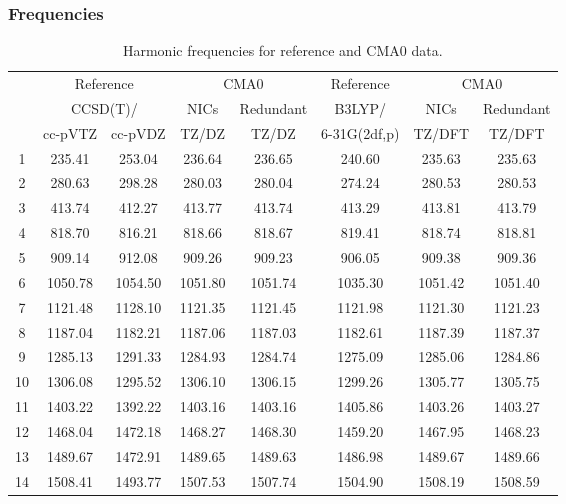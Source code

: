 \documentclass[10pt,oneside]{article}
\begin{document}
\begin{table}[h!]
\subsubsection*{Frequencies}
\centering
\caption{Harmonic frequencies for reference and CMA0 data.}
\begin{tabular}{cccccccc}
\toprule
{} & \multicolumn{2}{c}{Reference} & \multicolumn{2}{c}{CMA0} &    Reference & \multicolumn{2}{c}{CMA0} \\
{} & \multicolumn{2}{c}{CCSD(T)/} &    NICs &  Redundant &       B3LYP/ &    NICs & Redundant \\
{} &   cc-pVTZ & cc-pVDZ &   TZ/DZ &      TZ/DZ & 6-31G(2df,p) &  TZ/DFT &    TZ/DFT \\
\midrule
1  &    235.41 &  253.04 &  236.64 &     236.65 &       240.60 &  235.63 &    235.63 \\
2  &    280.63 &  298.28 &  280.03 &     280.04 &       274.24 &  280.53 &    280.53 \\
3  &    413.74 &  412.27 &  413.77 &     413.74 &       413.29 &  413.81 &    413.79 \\
4  &    818.70 &  816.21 &  818.66 &     818.67 &       819.41 &  818.74 &    818.81 \\
5  &    909.14 &  912.08 &  909.26 &     909.23 &       906.05 &  909.38 &    909.36 \\
6  &   1050.78 & 1054.50 & 1051.80 &    1051.74 &      1035.30 & 1051.42 &   1051.40 \\
7  &   1121.48 & 1128.10 & 1121.35 &    1121.45 &      1121.98 & 1121.30 &   1121.23 \\
8  &   1187.04 & 1182.21 & 1187.06 &    1187.03 &      1182.61 & 1187.39 &   1187.37 \\
9  &   1285.13 & 1291.33 & 1284.93 &    1284.74 &      1275.09 & 1285.06 &   1284.86 \\
10 &   1306.08 & 1295.52 & 1306.10 &    1306.15 &      1299.26 & 1305.77 &   1305.75 \\
11 &   1403.22 & 1392.22 & 1403.16 &    1403.16 &      1405.86 & 1403.26 &   1403.27 \\
12 &   1468.04 & 1472.18 & 1468.27 &    1468.30 &      1459.20 & 1467.95 &   1468.23 \\
13 &   1489.67 & 1472.91 & 1489.65 &    1489.63 &      1486.98 & 1489.67 &   1489.66 \\
14 &   1508.41 & 1493.77 & 1507.53 &    1507.74 &      1504.90 & 1508.19 &   1508.59 \\

\end{tabular}
\end{table}
\end{document}
